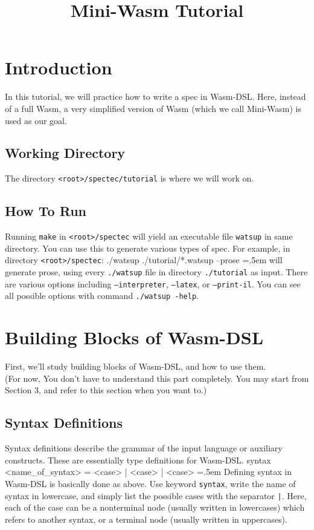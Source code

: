 \documentclass{article}
\date{}
\newenvironment{lcverbatim}
 {\SaveVerbatim{cverb}}
 {\endSaveVerbatim
  \flushleft\fboxrule=0pt\fboxsep=.5em
  \colorbox{cverbbg}{%
    \makebox[\dimexpr\linewidth-2\fboxsep][l]{\BUseVerbatim{cverb}}%
  }
  \endflushleft
}
\newcommand\K[1]{\texttt{#1}}
\begin{document}
\title{Mini-Wasm Tutorial}
\maketitle

\section{Introduction}
In this tutorial, we will practice how to write a spec in Wasm-DSL.
Here, instead of a full Wasm, a very simplified version of Wasm (which we call Mini-Wasm) is used as our goal.

\subsection{Working Directory}
The directory \K{<root>/spectec/tutorial} is where we will work on.

\subsection{How To Run}
Running \K{make} in \K{<root>/spectec} will yield an executable file \K{watsup} in same directory. You can use this to generate various types of spec. For example, in directory \K{<root>/spectec}:
\begin{lcverbatim}
./watsup ./tutorial/*.watsup --prose
\end{lcverbatim}
will generate prose, using every \K{./watsup} file in directory \K{./tutorial} as input. There are various options including \K{--interpreter}, \K{--latex}, or \K{--print-il}. You can see all possible options with command \K{./watsup -help}.

\section{Building Blocks of Wasm-DSL}
First, we'll study building blocks of Wasm-DSL, and how to use them. \\
(For now, You don't have to understand this part completely. You may start from Section 3, and refer to this section when you want to.)

\subsection{Syntax Definitions}
Syntax definitions describe the grammar of the input language or auxiliary constructs. These are essentially type definitions for Wasm-DSL.
\begin{lcverbatim}
syntax <name_of_syntax> = <case> | <case> | <case>
\end{lcverbatim}
Defining syntax in Wasm-DSL is basically done as above. Use keyword \K{syntax}, write the name of syntax in lowercase, and simply list the possible cases with the separator \K{|}. Here, each of the case can be a nonterminal node (usually written in lowercases) which refers to another syntax, or a terminal node (usually written in uppercases).
\end{document}
